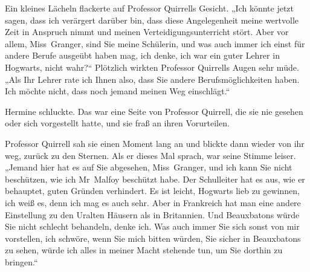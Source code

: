 Ein kleines Lächeln flackerte auf Professor Quirrells Gesicht. „Ich könnte jetzt sagen, dass ich verärgert darüber bin, dass diese Angelegenheit meine wertvolle Zeit in Anspruch nimmt und meinen Verteidigungsunterricht stört. Aber vor allem, Miss~Granger, sind Sie meine Schülerin, und was auch immer ich einst für andere Berufe ausgeübt haben mag, ich denke, ich war ein guter Lehrer in Hogwarts, nicht wahr?“ Plötzlich wirkten Professor Quirrells Augen sehr müde.
„Als Ihr Lehrer rate ich Ihnen also, dass Sie andere Berufsmöglichkeiten haben. Ich möchte nicht, dass noch jemand meinen Weg einschlägt.“

Hermine schluckte. Das war eine Seite von Professor Quirrell, die sie nie gesehen oder sich vorgestellt hatte, und sie fraß an ihren Vorurteilen.

Professor Quirrell sah sie einen Moment lang an und blickte dann wieder von ihr weg, zurück zu den Sternen. Als er dieses Mal sprach, war seine Stimme leiser. „Jemand hier hat es auf Sie abgesehen, Miss~Granger, und ich kann Sie nicht beschützen, wie ich Mr~Malfoy beschützt habe. Der Schulleiter hat es aus, wie er behauptet, guten Gründen verhindert. Es ist leicht, Hogwarts lieb zu gewinnen, ich weiß es, denn ich mag es auch sehr. Aber in Frankreich hat man eine andere Einstellung zu den Uralten Häusern als in Britannien. Und Beauxbatons würde Sie nicht schlecht behandeln, denke ich. Was auch immer Sie sich sonst von mir vorstellen, ich schwöre, wenn Sie mich bitten würden, Sie sicher in Beauxbatons zu sehen, würde ich alles in meiner Macht stehende tun, um Sie dorthin zu bringen.“

